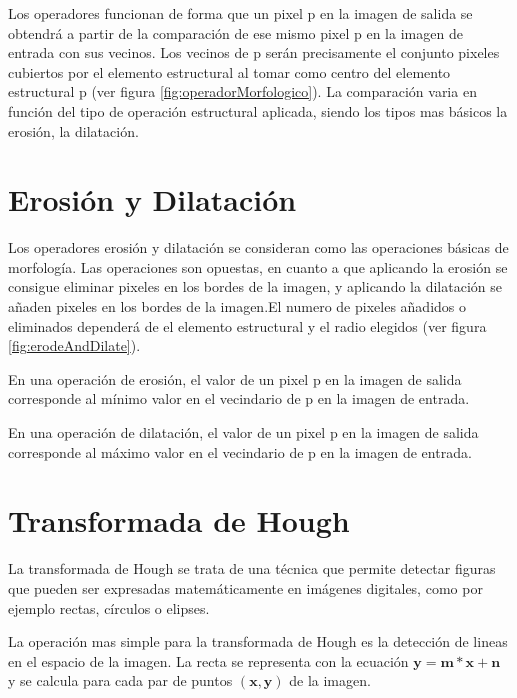 Los operadores funcionan de forma que un pixel p en la imagen de salida se obtendrá a partir de la comparación de ese mismo pixel p en la imagen de entrada con sus vecinos. Los vecinos de p serán precisamente el conjunto pixeles cubiertos por el elemento estructural al tomar como centro del elemento estructural p (ver figura \ref{fig:operadorMorfologico}). La comparación varia en función del tipo de operación estructural aplicada, siendo los tipos mas básicos la erosión, la dilatación.

\section{Erosión y Dilatación}

Los operadores erosión y dilatación se consideran como las operaciones básicas de morfología. Las operaciones son opuestas, en cuanto a que aplicando la erosión se consigue eliminar pixeles en los bordes de la imagen, y aplicando la dilatación se añaden pixeles en los bordes de la imagen.El numero de pixeles añadidos o eliminados dependerá de el elemento estructural y el radio elegidos (ver figura \ref{fig:erodeAndDilate}).


En una operación de erosión, el valor de un pixel p en la imagen de salida corresponde al mínimo valor en el vecindario de p en la imagen de entrada.

En una operación de dilatación, el valor de un pixel p en la imagen de salida corresponde al máximo valor en el vecindario de p en la imagen de entrada.

\section{Transformada de Hough} \label{Hough}

La transformada de Hough se trata de una técnica que permite detectar figuras que pueden ser expresadas matemáticamente  en imágenes digitales, como por ejemplo rectas, círculos o elipses\cite{wiki:Hough}.

La operación mas simple para la transformada de Hough es la detección de lineas en el espacio de la imagen.
La recta se representa con la ecuación $\mathbf{y= m*x+n}$  y se calcula para cada par de puntos $ \mathbf{\left ( x,y \right )}$ de la imagen.

